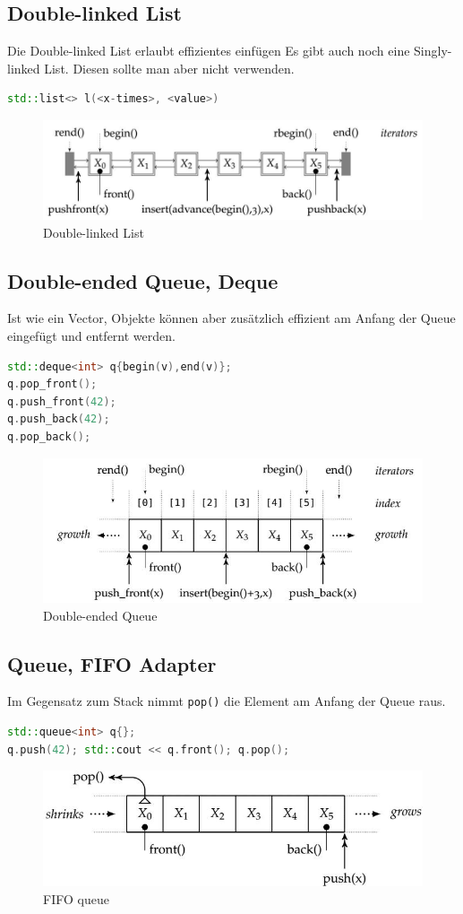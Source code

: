 \subsection{Double-linked List}
Die Double-linked List erlaubt effizientes einfügen 
Es gibt auch noch eine Singly-linked List. Diesen sollte man aber nicht verwenden. 
\begin{lstlisting}[language=C++]
std::list<> l(<x-times>, <value>)
\end{lstlisting}

\begin{figure}[h]
\centering
\includegraphics[width=0.5\linewidth]{images/double_linked_list}
\caption{Double-linked List}
\label{fig:doublelinkedlist}
\end{figure}

\subsection{Double-ended Queue, Deque}
Ist wie ein Vector, Objekte können aber zusätzlich effizient am Anfang der Queue eingefügt und entfernt werden. 
\begin{lstlisting}[language=C++]
std::deque<int> q{begin(v),end(v)};
q.pop_front();
q.push_front(42);
q.push_back(42);
q.pop_back();
\end{lstlisting}

\begin{figure}[h]
\centering
\includegraphics[width=0.5\linewidth]{images/deque}
\caption{Double-ended Queue}
\label{fig:deque}
\end{figure}

\subsection{Queue, FIFO Adapter}
Im Gegensatz zum Stack nimmt \lstinline[]|pop()| die Element am Anfang der Queue raus.
\begin{lstlisting}[language=C++]
std::queue<int> q{};
q.push(42); std::cout << q.front(); q.pop();
\end{lstlisting}
\begin{figure}[h]
\centering
\includegraphics[width=0.5\linewidth]{images/fifo_queue}
\caption{FIFO queue}
\label{fig:fifoqueue}
\end{figure}

